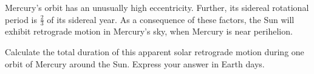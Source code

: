 Mercury's orbit has an unusually high eccentricity. Further, its sidereal
rotational period is $\frac{2}{3}$ of its sidereal year. As a consequence of
these factors, the Sun will exhibit retrograde motion in Mercury's sky, when
Mercury is near perihelion.

Calculate the total duration of this apparent solar retrograde motion during
one orbit of Mercury around the Sun. Express your answer in Earth days.
